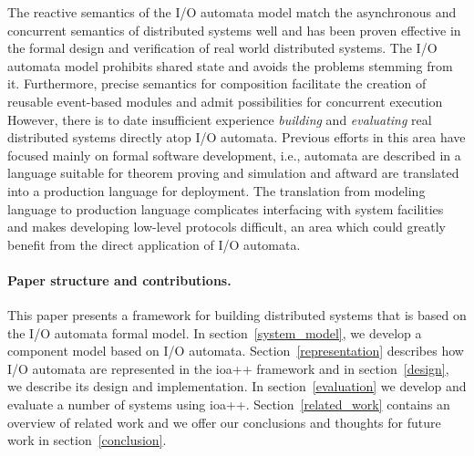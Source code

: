 The reactive semantics of the I/O automata model match the asynchronous and concurrent semantics of distributed systems well and has been proven effective in the formal design and verification of real world distributed systems.
The I/O automata model prohibits shared state and avoids the problems stemming from it.
Furthermore, precise semantics for composition facilitate the creation of reusable event-based modules and admit possibilities for concurrent execution
However, there is to date insufficient experience \emph{building} and \emph{evaluating} real distributed systems directly atop I/O automata.
Previous efforts in this area have focused mainly on formal software development, i.e., automata are described in a language suitable for theorem proving and simulation and aftward are translated into a production language for deployment.
The translation from modeling language to production language complicates interfacing with system facilities and makes developing low-level protocols difficult, an area which could greatly benefit from the direct application of I/O automata.

\paragraph{Paper structure and contributions.}
This paper presents a framework for building distributed systems that is based on the I/O automata formal model.
In section~\ref{system_model}, we develop a component model based on I/O automata.
Section~\ref{representation} describes how I/O automata are represented in the ioa++ framework and in section~\ref{design}, we describe its design and implementation.
In section~\ref{evaluation} we develop and evaluate a number of systems using ioa++.
Section~\ref{related_work} contains an overview of related work and we offer our conclusions and thoughts for future work in section~\ref{conclusion}.


